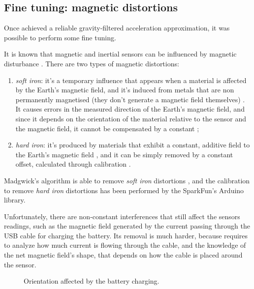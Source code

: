 \subsection{Fine tuning: magnetic distortions}
Once achieved a reliable gravity-filtered acceleration approximation, it was possible to perform some fine tuning.
\bigbreak

It is known that magnetic and inertial sensors can be influenced by magnetic disturbance \cite{Fan17}.
There are two types of magnetic distortions:
\begin{enumerate}
	\item \textit{soft iron}: it's a temporary influence that appears when a material is affected by the Earth's magnetic field, and it's induced from metals that are non permanently magnetised (they don't generate a magnetic field themselves) \cite{Cro15}. It causes errors in the measured direction of the Earth's magnetic field, and since it depends on the orientation of the material relative to the sensor and the magnetic field, it cannot be compensated by a constant \cite{CompensatingIron};
	\item \textit{hard iron}: it's produced by materials that exhibit a constant, additive field to the Earth's magnetic field \cite{CompensatingIron}, and it can be simply removed by a constant offset, calculated through calibration \cite{CompensatingIron, Geb06, Kok12}.
\end{enumerate}

Madgwick's algorithm is able to remove \textit{soft iron} distortions \cite[11-12]{Mad10}, and the calibration to remove \textit{hard iron} distortions has been performed by the SparkFun's Arduino library.
\bigbreak

Unfortunately, there are non-constant interferences that still affect the sensors readings, such as the magnetic field generated by the current passing through the USB cable for charging the battery.
Its removal is much harder, because requires to analyze how much current is flowing through the cable, and the knowledge of the net magnetic field's shape, that depends on how the cable is placed around the sensor.

\begin{center}
	\begin{figure}[ht]
		\caption{Orientation affected by the battery charging.}
	\end{figure}
\end{center}

